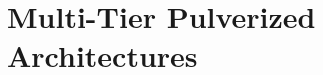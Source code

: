 
\chapter{Multi-Tier Pulverized Architectures}
\minitoc%
%
\newcommand{\scalaloci}{{ScalaLoci}}
\newcommand{\scafiloci}{{ScaFiLoci}}
\newcommand{\scalainline}[1]{\texttt{#1}}

